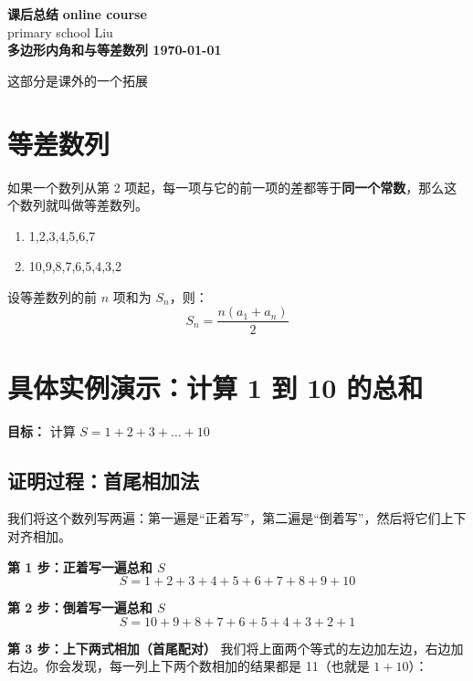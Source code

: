 \documentclass[DIN, pagenumber=false, fontsize=11pt, parskip=half]{scrartcl}
\newcommand{\mytitle}[1]{{\noindent\Large\textbf{#1}}}
\begin{document}
\noindent\textbf{课后总结} \hfill \textbf{online course}\\
primary school \hfill Liu\\

\mytitle{多边形内角和与等差数列 \hfill \today}
\newline
\begin{parchmentquote}
    这部分是课外的一个拓展

\end{parchmentquote}


\section{等差数列}
如果一个数列从第 2 项起，每一项与它的前一项的差都等于\textbf{同一个常数}，那么这个数列就叫做等差数列。
\begin{enumerate}
    \item 1,2,3,4,5,6,7
    \item 10,9,8,7,6,5,4,3,2
\end{enumerate}  
\begin{tcolorbox}[colback=green!5!white, colframe=green!50!black, title=前 $n$ 项和公式]
    设等差数列的前 $n$ 项和为 $S_n$，则：
    \[
    S_n = \frac{n(a_1 + a_n)}{2} 
    \]
\end{tcolorbox}
\section*{具体实例演示：计算 1 到 10 的总和}

\textbf{目标：} 计算 $S = 1 + 2 + 3 + \dots + 10$

\subsection*{证明过程：首尾相加法}

我们将这个数列写两遍：第一遍是“正着写”，第二遍是“倒着写”，然后将它们上下对齐相加。

\textbf{第 1 步：正着写一遍总和 $S$}
\[
S = 1 + 2 + 3 + 4 + 5 + 6 + 7 + 8 + 9 + 10
\]

\textbf{第 2 步：倒着写一遍总和 $S$}
\[
S = 10 + 9 + 8 + 7 + 6 + 5 + 4 + 3 + 2 + 1
\]

\textbf{第 3 步：上下两式相加（首尾配对）}
我们将上面两个等式的左边加左边，右边加右边。你会发现，每一列上下两个数相加的结果都是 11（也就是 $1+10$）：
\end{document}
